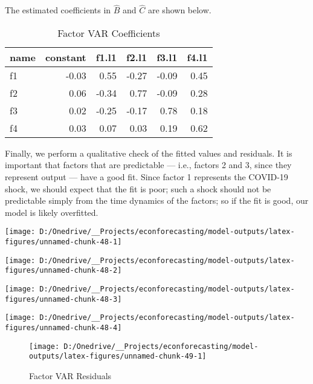 \documentclass[11pt, letterpaper]{article}\usepackage[]{graphicx}\usepackage[]{color}
\begin{document}
The estimated coefficients in $\widehat{B}$ and $\widehat{C}$ are shown below.
\begin{table}[H]
\centering
\begingroup\footnotesize
\begin{tabular}{lrrrrr}
  \hline
name & constant & f1.l1 & f2.l1 & f3.l1 & f4.l1 \\ 
  \hline
f1 & -0.03 & 0.55 & -0.27 & -0.09 & 0.45 \\ 
  f2 & 0.06 & -0.34 & 0.77 & -0.09 & 0.28 \\ 
  f3 & 0.02 & -0.25 & -0.17 & 0.78 & 0.18 \\ 
  f4 & 0.03 & 0.07 & 0.03 & 0.19 & 0.62 \\ 
   \hline
\end{tabular}
\endgroup
\caption{Factor VAR Coefficients} 
\end{table}



Finally, we perform a qualitative check of the fitted values and residuals. It is important that factors that are predictable --- i.e., factors 2 and 3, since they represent output --- have a good fit. Since factor 1 represents the COVID-19 shock, we should expect that the fit is poor; such a shock should not be predictable simply from the time dynamics of the factors; so if the fit is good, our model is likely overfitted.


{\centering \texttt{[image: D:/Onedrive/\_\_Projects/econforecasting/model-outputs/latex-figures/unnamed-chunk-48-1]} 

}




{\centering \texttt{[image: D:/Onedrive/\_\_Projects/econforecasting/model-outputs/latex-figures/unnamed-chunk-48-2]} 

}




{\centering \texttt{[image: D:/Onedrive/\_\_Projects/econforecasting/model-outputs/latex-figures/unnamed-chunk-48-3]} 

}




{\centering \texttt{[image: D:/Onedrive/\_\_Projects/econforecasting/model-outputs/latex-figures/unnamed-chunk-48-4]} 

}





\begin{figure}[H]

{\centering \texttt{[image: D:/Onedrive/\_\_Projects/econforecasting/model-outputs/latex-figures/unnamed-chunk-49-1]} 

}

\caption[Factor VAR Residuals]{Factor VAR Residuals}\label{fig:unnamed-chunk-49}
\end{figure}
\end{document}
